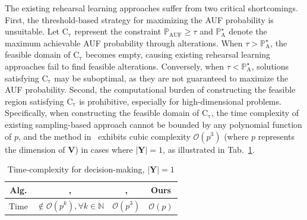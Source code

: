 \documentclass{article}
\theoremstyle{plain}
\theoremstyle{definition}
\def \V {\mathbf{V}}
\def \Y{\mathbf{Y}}
\def \V {\mathbf{V}}
\def \Y {\mathbf{Y}}
\def \V {\mathbf{V}}
\begin{document}
The existing rehearsal learning approaches suffer from two critical shortcomings.
First, the threshold-based strategy for maximizing the AUF probability is unsuitable. Let $\operatorname*{C_\tau}$ represent the constraint $\mathbb{P}_{\operatorname*{AUF}}\geq \tau$ and $\mathbb{P}_{\operatorname*{A}}^\star$ denote the maximum achievable AUF probability through alterations. 
When $\tau > \mathbb{P}_{\operatorname*{A}}^\star$, the feasible domain of $\operatorname*{C_\tau}$ becomes empty, causing existing rehearsal learning approaches fail to find feasible alterations. 
Conversely, when $\tau < \mathbb{P}_{\operatorname*{A}}^\star$, solutions satisfying $\operatorname*{C_\tau}$ may be suboptimal, as they are not guaranteed to maximize the AUF probability. 
Second, the computational burden of constructing the feasible region satisfying $\operatorname*{C_\tau}$ is prohibitive, especially for high-dimensional problems.
Specifically, when constructing the feasible domain of $\operatorname*{C_\tau}$, the time complexity of existing sampling-based approach cannot be bounded by any polynomial function of $p$, and the method in~\citet{du2024micns} exhibits cubic complexity $\mathcal{O}(p^3)$ (where $p$ represents the dimension of $\V$) 
in cases where $|\Y|=1$, as illustrated in Tab.~\ref{tab:comparison}.


\begin{table}[t]
  \centering
  \caption{Time-complexity for decision-making, $|\Y|=1$}
  \label{tab:comparison}
  \vskip 0.1in
  \begin{center}
    \begin{small}
      \begin{sc}
  \begin{tabular}{cccc}
    \toprule
    Alg. & \citeauthor{qint2023srm}, \citeyear{qint2023srm} & \citeauthor{du2024micns}, \citeyear{du2024micns}  & Ours \\
    \midrule
    Time  & $\not\in\mathcal{O}\left(p^k\right), \forall k\in\mathbb{N}$ & $\mathcal{O}\left(p^3\right)$  & $\mathcal{O}\left(p\right)$\\
    \bottomrule
  \end{tabular}
  \end{sc}
  \end{small}
  \end{center}
  \vskip -0.15in
\end{table}
\end{document}
